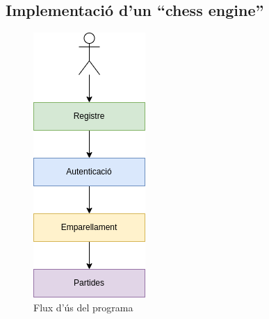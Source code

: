 \subsection{Implementació d’un “chess engine”}
\begin{figure}
    \begin{center}
        \includegraphics[width=0.75\linewidth]{images/multijugador.png} 
        \caption{Flux d'ús del programa}
        \label{fig:Flux d'ús del programa}
    \end{center}
\end{figure}
